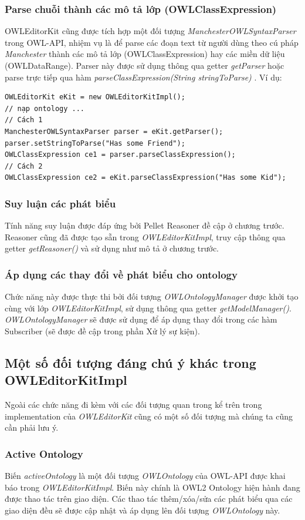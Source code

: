 \subsubsection{Parse chuỗi thành các mô tả lớp (OWLClassExpression)}
OWLEditorKit cũng được tích hợp một đối tượng \textit{ManchesterOWLSyntaxParser} trong OWL-API, nhiệm vụ là để parse các đoạn text từ người dùng theo cú pháp \textit{Manchester} thành các mô tả lớp (OWLClassExpression) hay các miền dữ liệu (OWLDataRange). Parser này được sử dụng thông qua getter \textit{getParser} hoặc parse trực tiếp qua hàm \textit{parseClassExpression(String stringToParse)} . Ví dụ:
\begin{verbatim}
OWLEditorKit eKit = new OWLEditorKitImpl();
// nạp ontology ...
// Cách 1
ManchesterOWLSyntaxParser parser = eKit.getParser();
parser.setStringToParse("Has some Friend");
OWLClassExpression ce1 = parser.parseClassExpression();
// Cách 2 
OWLClassExpression ce2 = eKit.parseClassExpression("Has some Kid");
\end{verbatim}

\subsubsection{Suy luận các phát biểu}
Tính năng suy luận được đáp ứng bởi Pellet Reasoner đề cập ở chương trước. Reasoner cũng đã được tạo sẵn trong \textit{OWLEditorKitImpl}, truy cập thông qua getter \textit{getReasoner()} và sử dụng như mô tả ở chương trước.

\subsubsection{Áp dụng các thay đổi về phát biểu cho ontology}
Chức năng này được thực thi bởi đối tượng \textit{OWLOntologyManager} được khởi tạo cùng với lớp \textit{OWLEditorKitImpl}, sử dụng thông qua getter \textit{getModelManager()}.
\textit{OWLOntologyManager} sẽ được sử dụng để áp dụng thay đổi trong các hàm Subscriber (sẽ được đề cập trong phần Xử lý sự kiện).

\subsection{Một số đối tượng đáng chú ý khác trong OWLEditorKitImpl}
Ngoài các chức năng đi kèm với các đối tượng quan trong kể trên trong implementation của \textit{OWLEditorKit} cũng có một số đối tượng mà chúng ta cũng cần phải lưu ý.
\subsubsection{Active Ontology}
Biến  \textit{activeOntology} là một đối tượng \textit{OWLOntology} của OWL-API được khai báo trong \textit{OWLEditorKitImpl}. Biến này chính là OWL2 Ontology hiện hành đang được thao tác trên giao diện. Các thao tác thêm/xóa/sửa các phát biểu qua các giao diện đều sẽ được cập nhật và áp dụng lên đối tượng \textit{OWLOntology} này.
